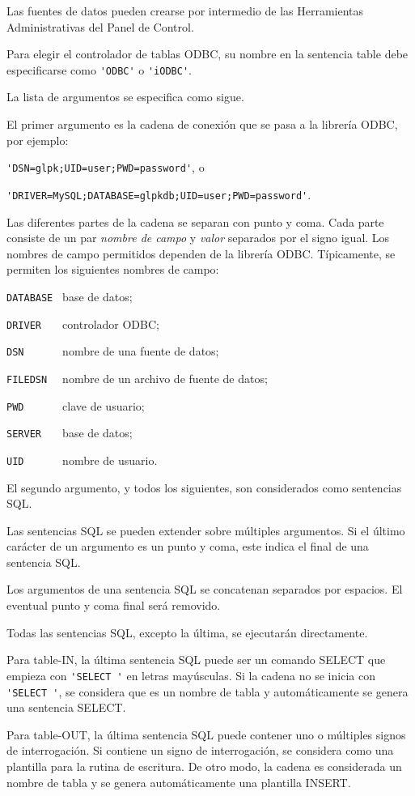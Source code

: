 \documentclass[11pt,spanish]{report}
\begin{document}
Las fuentes de datos pueden crearse por intermedio de las Herramientas Administrativas del Panel de Control.

Para elegir el controlador de tablas ODBC, su nombre en la sentencia table debe especificarse como \verb|'ODBC'| o \verb|'iODBC'|.

La lista de argumentos se especifica como sigue.

El primer argumento es la cadena de conexión que se pasa a la librería ODBC, por ejemplo:

\verb|'DSN=glpk;UID=user;PWD=password'|, o

\verb|'DRIVER=MySQL;DATABASE=glpkdb;UID=user;PWD=password'|.

Las diferentes partes de la cadena se separan con punto y coma. Cada parte consiste de un par {\it nombre de campo} y {\it valor} separados por el signo igual. Los nombres de campo permitidos dependen de la librería ODBC. Típicamente, se permiten los siguientes nombres de campo:

\verb|DATABASE | base de datos;

\verb|DRIVER   | controlador ODBC;

\verb|DSN      | nombre de una fuente de datos;

\verb|FILEDSN  | nombre de un archivo de fuente de datos;

\verb|PWD      | clave de usuario;

\verb|SERVER   | base de datos;

\verb|UID      | nombre de usuario.

El segundo argumento, y todos los siguientes, son considerados como sentencias SQL.

Las sentencias SQL se pueden extender sobre múltiples argumentos. Si el último carácter de un argumento es un punto y coma, este indica el final de una sentencia SQL.

Los argumentos de una sentencia SQL se concatenan separados por espacios. El eventual punto y coma final será removido.

Todas las sentencias SQL, excepto la última, se ejecutarán directamente.

Para table-IN, la última sentencia SQL puede ser un comando SELECT que empieza con \verb|'SELECT '| en letras mayúsculas. Si la cadena no se inicia con \verb|'SELECT '|, se considera que es un nombre de tabla y automáticamente se genera una sentencia SELECT.

Para table-OUT, la última sentencia SQL puede contener uno o múltiples signos de interrogación. Si contiene un signo de interrogación, se considera como una plantilla para la rutina de escritura. De otro modo, la cadena es considerada un nombre de tabla y se genera automáticamente una plantilla INSERT.
\end{document}
